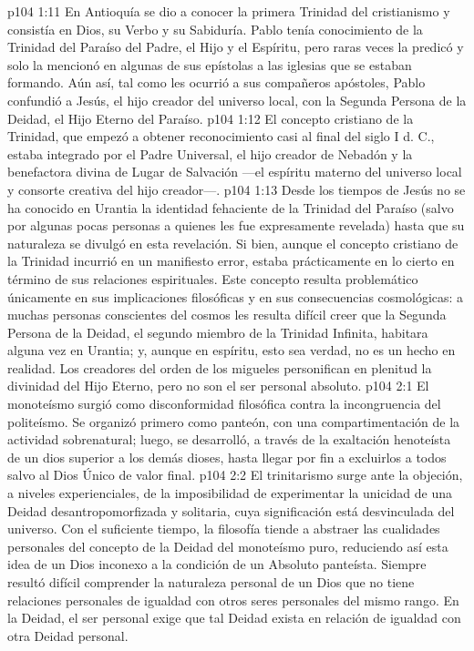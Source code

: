 \vs p104 1:11 En Antioquía se dio a conocer la primera Trinidad del cristianismo y consistía en Dios, su Verbo y su Sabiduría. Pablo tenía conocimiento de la Trinidad del Paraíso del Padre, el Hijo y el Espíritu, pero raras veces la predicó y solo la mencionó en algunas de sus epístolas a las iglesias que se estaban formando. Aún así, tal como les ocurrió a sus compañeros apóstoles, Pablo confundió a Jesús, el hijo creador del universo local, con la Segunda Persona de la Deidad, el Hijo Eterno del Paraíso.
\vs p104 1:12 El concepto cristiano de la Trinidad, que empezó a obtener reconocimiento casi al final del siglo I d. C., estaba integrado por el Padre Universal, el hijo creador de Nebadón y la benefactora divina de Lugar de Salvación ---el espíritu materno del universo local y consorte creativa del hijo creador---.
\vs p104 1:13 Desde los tiempos de Jesús no se ha conocido en Urantia la identidad fehaciente de la Trinidad del Paraíso (salvo por algunas pocas personas a quienes les fue expresamente revelada) hasta que su naturaleza se divulgó en esta revelación. Si bien, aunque el concepto cristiano de la Trinidad incurrió en un manifiesto error, estaba prácticamente en lo cierto en término de sus relaciones espirituales. Este concepto resulta problemático únicamente en sus implicaciones filosóficas y en sus consecuencias cosmológicas: a muchas personas conscientes del cosmos les resulta difícil creer que la Segunda Persona de la Deidad, el segundo miembro de la Trinidad Infinita, habitara alguna vez en Urantia; y, aunque en espíritu, esto sea verdad, no es un hecho en realidad. Los creadores del orden de los migueles personifican en plenitud la divinidad del Hijo Eterno, pero no son el ser personal absoluto.
\vs p104 2:1 El monoteísmo surgió como disconformidad filosófica contra la incongruencia del politeísmo. Se organizó primero como panteón, con una compartimentación de la actividad sobrenatural; luego, se desarrolló, a través de la exaltación henoteísta de un dios superior a los demás dioses, hasta llegar por fin a excluirlos a todos salvo al Dios Único de valor final.
\vs p104 2:2 El trinitarismo surge ante la objeción, a niveles experienciales, de la imposibilidad de experimentar la unicidad de una Deidad desantropomorfizada y solitaria, cuya significación está desvinculada del universo. Con el suficiente tiempo, la filosofía tiende a abstraer las cualidades personales del concepto de la Deidad del monoteísmo puro, reduciendo así esta idea de un Dios inconexo a la condición de un Absoluto panteísta. Siempre resultó difícil comprender la naturaleza personal de un Dios que no tiene relaciones personales de igualdad con otros seres personales del mismo rango. En la Deidad, el ser personal exige que tal Deidad exista en relación de igualdad con otra Deidad personal.
